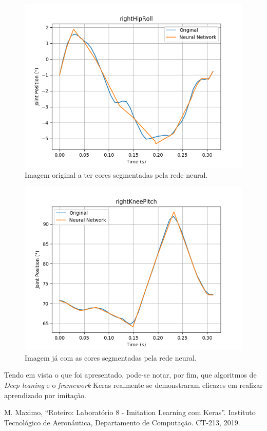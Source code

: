 \documentclass[conference]{IEEEtran}
\begin{document}
\begin{figure}[htbp]
\centering
\centerline{\includegraphics[scale=0.5]{imagens/imitation_learning/rightHipRoll.png}}
\caption{Imagem original a ter cores segmentadas pela rede neural.}
\label{imitation_learning/rightHipRoll}
\end{figure}

\begin{figure}[htbp]
\centering
\centerline{\includegraphics[scale=0.5]{imagens/imitation_learning/rightKneePitch.png}}
\caption{Imagem já com as cores segmentadas pela rede neural.}
\label{imitation_learning/rightKneePitch}
\end{figure}

Tendo em vista o que foi apresentado, pode-se notar, por fim, que algoritmos de \textit{Deep leaning} e o \textit{framework} Keras realmente se demonstraram eficazes em realizar aprendizado por imitação.

\begin{thebibliography}{00}
 M. Maximo, ``Roteiro: Laboratório 8 - Imitation Learning com Keras''. Instituto Tecnológico de Aeronáutica, Departamento de Computação. CT-213, 2019.
\end{thebibliography}
\end{document}
